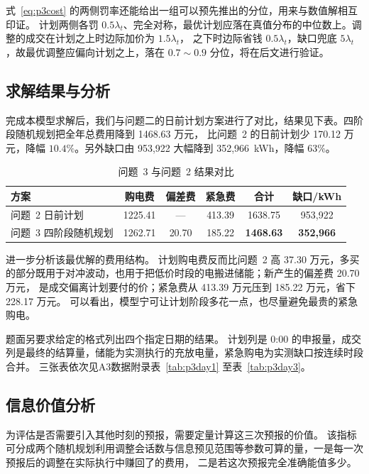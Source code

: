 \documentclass[zihao=-4,a4paper,fontset=none]{ctexart}
\begin{document}
式~\eqref{eq:p3cost} 的两侧罚率还能给出一组可以预先推出的分位，用来与数值解相互印证。
计划两侧各罚 $0.5\lambda_t$、完全对称，最优计划应落在真值分布的中位数上。调整的成交在计划之上时边际加价为 $1.5\lambda_t$，
之下时边际省钱 $0.5\lambda_t$，缺口兜底 $5\lambda_t$，故最优调整应偏向计划之上，落在 $0.7\sim0.9$ 分位，将在后文进行验证。

\subsection{求解结果与分析}
\label{sub:p3result}

完成本模型求解后，我们与问题二的日前计划方案进行了对比，结果见下表。四阶段随机规划把全年总费用降到 1468.63 万元，
比问题~2 的日前计划少 170.12 万元，降幅 $10.4\%$。另外缺口由 953{,}922 大幅降到 352{,}966~kWh，降幅 $63\%$。

\begin{table}[htbp]
\centering
\caption{问题~3 与问题~2 结果对比}
{\small
\begin{tabular}{lccccc}
\toprule
方案 & 购电费 & 偏差费 & 紧急费 & 合计 & 缺口/kWh \\
\midrule
问题~2 日前计划 & 1225.41 & --- & 413.39 & 1638.75 & 953{,}922 \\
问题~3 四阶段随机规划 & 1262.71 & 20.70 & 185.22 & \textbf{1468.63} & \textbf{352{,}966} \\
\bottomrule
\end{tabular}}
\label{tab:p3result}
\end{table}

进一步分析该最优解的费用结构。
计划购电费反而比问题~2 高 37.30 万元，多买的部分既用于对冲波动，也用于把低价时段的电搬进储能；新产生的偏差费 20.70 万元，
是成交偏离计划要付的价；紧急费从 413.39 万元压到 185.22 万元，省下 228.17 万元。
可以看出，模型宁可让计划阶段多花一点，也尽量避免最贵的紧急购电。

题面另要求给定的格式列出四个指定日期的结果。
计划列是 0:00 的申报量，成交列是最终的结算量，储能为实测执行的充放电量，紧急购电为实测缺口按连续时段合并。
三张表依次见A3数据附录表~\ref{tab:p3day1} 至表~\ref{tab:p3day3}。
\subsection{信息价值分析}
\label{sub:p3value}

为评估是否需要引入其他时刻的预报，需要定量计算这三次预报的价值。
该指标可分成两个随机规划利用调整会话数与信息预见范围等参数可算的量，一是每一次预报后的调整在实际执行中赚回了的费用，
二是若这次预报完全准确能值多少。
\end{document}
